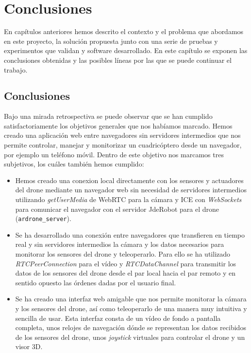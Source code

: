 \chapter{Conclusiones}

En capítulos anteriores hemos descrito el contexto y el problema que abordamos en este proyecto, la solución propuesta junto con una serie de pruebas y experimentos que validan y software desarrollado. En este capítulo se exponen las conclusiones obtenidas y las posibles líneas por las que se puede continuar el trabajo.\\

\section{Conclusiones}

Bajo una mirada retrospectiva se puede observar que se han cumplido satisfactoriamente los objetivos generales que nos habíamos marcado. Hemos creado una aplicación web entre navegadores sin servidores intermedios que nos permite controlar, manejar y monitorizar un cuadricóptero desde un navegador, por ejemplo un teléfono móvil. Dentro de este objetivo nos marcamos tres subjetivos, los cuáles también hemos cumplido:\\

\begin{itemize}
\item Hemos creado una conexion local directamente con los sensores y actuadores del drone mediante un navegador web sin necesidad de servidores intermedios utilizando \emph{getUserMedia} de WebRTC para la cámara y ICE con \emph{WebSockets} para comunicar el navegador con el servidor JdeRobot para el drone (\texttt{ardrone\_server}).
\item Se ha desarrollado una conexión entre navegadores que transfieren en tiempo real y sin servidores intermedios la cámara y los datos necesarios para monitorar los sensores del drone y teleoperarlo. Para ello se ha utilizado \emph{RTCPeerConnection} para el vídeo y \emph{RTCDataChannel} para transmitir los datos de los sensores del drone desde el par local hacia el par remoto y en sentido opuesto las órdenes dadas por el usuario final.
\item Se ha creado una interfaz web amigable que nos permite monitorar la cámara y los sensores del drone, así como teleoperarlo de una manera muy intuitiva y sencilla de usar. Esta interfaz consta de un vídeo de fondo a pantalla completa, unos relojes de navegación dónde se representan los datos recibidos de los sensores del drone, unos \emph{joystick} virtuales para controlar el drone y un visor 3D.
\end{itemize} 

